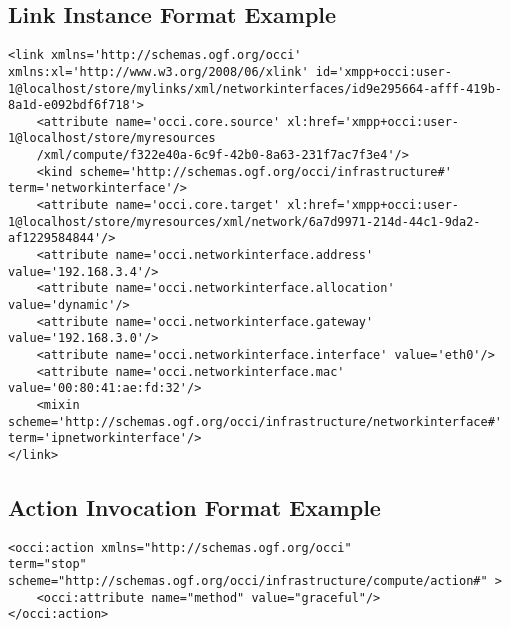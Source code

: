 \documentclass[10pt,a4paper]{article}
\begin{document}
\subsection{Link Instance Format Example}
\label{sec:example_link}

\begin{lstlisting}
<link xmlns='http://schemas.ogf.org/occi' xmlns:xl='http://www.w3.org/2008/06/xlink' id='xmpp+occi:user-1@localhost/store/mylinks/xml/networkinterfaces/id9e295664-afff-419b-8a1d-e092bdf6f718'>
	<attribute name='occi.core.source' xl:href='xmpp+occi:user-1@localhost/store/myresources
	/xml/compute/f322e40a-6c9f-42b0-8a63-231f7ac7f3e4'/>
	<kind scheme='http://schemas.ogf.org/occi/infrastructure#' term='networkinterface'/>
	<attribute name='occi.core.target' xl:href='xmpp+occi:user-1@localhost/store/myresources/xml/network/6a7d9971-214d-44c1-9da2-af1229584844'/>
	<attribute name='occi.networkinterface.address' value='192.168.3.4'/>
	<attribute name='occi.networkinterface.allocation' value='dynamic'/>
	<attribute name='occi.networkinterface.gateway' value='192.168.3.0'/>
	<attribute name='occi.networkinterface.interface' value='eth0'/>
	<attribute name='occi.networkinterface.mac' value='00:80:41:ae:fd:32'/>
	<mixin scheme='http://schemas.ogf.org/occi/infrastructure/networkinterface#' term='ipnetworkinterface'/>
</link>
\end{lstlisting}

\subsection{Action Invocation Format Example}
\label{sec:example_action_invocation}

\begin{lstlisting}
<occi:action xmlns="http://schemas.ogf.org/occi"
term="stop" scheme="http://schemas.ogf.org/occi/infrastructure/compute/action#" >
	<occi:attribute name="method" value="graceful"/>
</occi:action>
\end{lstlisting}
\end{document}
